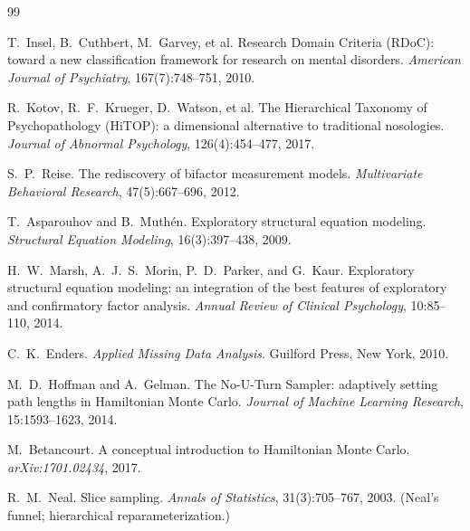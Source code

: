 \begingroup
\renewcommand{\section}[2]{\par\vspace{1.2em}\noindent{\sffamily\bfseries\Large\color{faceaccent}References}\par\vspace{0.4em}}
\begin{thebibliography}{99}
\small

 T.~Insel, B.~Cuthbert, M.~Garvey, et al.
\newblock Research Domain Criteria (RDoC): toward a new classification framework for research on mental
disorders. \emph{American Journal of Psychiatry}, 167(7):748--751, 2010.

 R.~Kotov, R.~F.~Krueger, D.~Watson, et al.
\newblock The Hierarchical Taxonomy of Psychopathology (HiTOP): a dimensional alternative to traditional
nosologies. \emph{Journal of Abnormal Psychology}, 126(4):454--477, 2017.

 S.~P.~Reise.
\newblock The rediscovery of bifactor measurement models. \emph{Multivariate Behavioral Research},
47(5):667--696, 2012.

 T.~Asparouhov and B.~Muth\'en.
\newblock Exploratory structural equation modeling. \emph{Structural Equation Modeling}, 16(3):397--438, 2009.

 H.~W.~Marsh, A.~J.~S.~Morin, P.~D.~Parker, and G.~Kaur.
\newblock Exploratory structural equation modeling: an integration of the best features of exploratory and
confirmatory factor analysis. \emph{Annual Review of Clinical Psychology}, 10:85--110, 2014.

 C.~K.~Enders.
\newblock \emph{Applied Missing Data Analysis}. Guilford Press, New York, 2010.

 M.~D.~Hoffman and A.~Gelman.
\newblock The No-U-Turn Sampler: adaptively setting path lengths in Hamiltonian Monte Carlo.
\emph{Journal of Machine Learning Research}, 15:1593--1623, 2014.

 M.~Betancourt.
\newblock A conceptual introduction to Hamiltonian Monte Carlo. \emph{arXiv:1701.02434}, 2017.

 R.~M.~Neal.
\newblock Slice sampling. \emph{Annals of Statistics}, 31(3):705--767, 2003.
(Neal's funnel; hierarchical reparameterization.)


\end{thebibliography}
